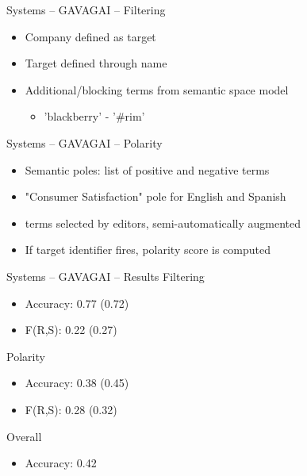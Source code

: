 \documentclass[12pt,a4paper]{beamer}
\begin{document}
\begin{frame}{Systems -- GAVAGAI -- Filtering}
\begin{itemize}
\item Company defined as target
\item Target defined through name
\item Additional/blocking terms from semantic space model
  \begin{itemize}
  \item 'blackberry' - '\#rim'
  \end{itemize}
\end{itemize}

\end{frame}

\begin{frame}{Systems -- GAVAGAI -- Polarity}
\begin{itemize}
\item Semantic poles: list of positive and negative terms
\item "Consumer Satisfaction" pole for English and Spanish
\item terms selected by editors, semi-automatically augmented
\item If target identifier fires, polarity score is computed
\end{itemize}

\end{frame}

\begin{frame}{Systems -- GAVAGAI -- Results}
Filtering
\begin{itemize}
\item Accuracy: 0.77 (0.72)
\item F(R,S): 0.22 (0.27)
\end{itemize}
Polarity
\begin{itemize}
\item Accuracy: 0.38 (0.45)
\item F(R,S): 0.28 (0.32)
\end{itemize}
Overall
\begin{itemize}
\item Accuracy: 0.42
\end{itemize}

\end{frame}



\end{document}
